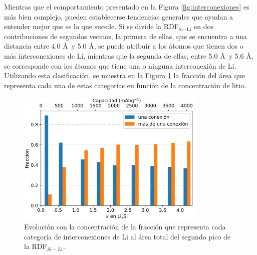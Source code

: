 Mientras que el comportamiento presentado en la Figura \ref{fig:interconexiones}
es más bien complejo, pueden establecerse tendencias generales que ayudan a 
entender mejor que es lo que sucede. Si se divide la RDF$_{\text{Si}-\text{Li}}$ en dos 
contribuciones de segundos vecinos, la primera de ellas, que se encuentra a una
distancia entre 4.0 \AA\ y 5.0 \AA, se puede atribuir a los átomos que tienen dos 
o más interconexiones de Li, mientras que la segunda de ellas, entre 5.0 \AA\ y
5.6 \AA, se corresponde con los átomos que tiene una o ninguna interconexión de 
Li. Utilizando esta clasificación, se muestra en la Figura 
\ref{fig:interconexiones-areas} la fracción del área que representa cada una de
estas categorías en función de la concentración de litio.
\begin{figure}[h!]
    \centering
    \includegraphics[width=0.8\textwidth]{Silicio/caracterizacion/resultados/interconexion/interconexiones-areas.png}
    \caption{Evolución con la concentración de la fracción que representa cada
    categoría de interconexiones de Li al área total del segundo pico de la 
    RDF$_{Si-Li}$.}
    \label{fig:interconexiones-areas}
\end{figure}
